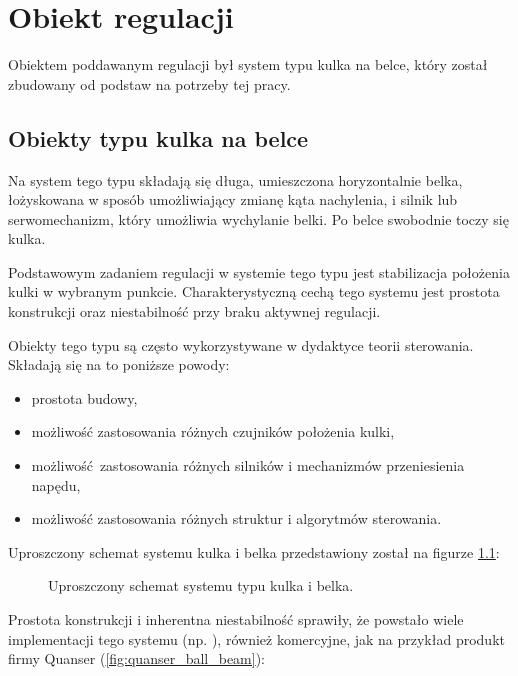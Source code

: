 \chapter{Obiekt regulacji}
\label{cha:ch2_obiekt_regulacji}

Obiektem poddawanym regulacji był system typu kulka na belce, który został zbudowany od podstaw na potrzeby tej pracy.

\section{Obiekty typu kulka na belce}

Na system tego typu składają się długa, umieszczona horyzontalnie belka, łożyskowana w sposób umożliwiający zmianę kąta nachylenia, i silnik lub serwomechanizm, który umożliwia wychylanie belki.
Po belce swobodnie toczy się kulka.

Podstawowym zadaniem regulacji w systemie tego typu jest stabilizacja położenia kulki w wybranym punkcie.
Charakterystyczną cechą tego systemu jest prostota konstrukcji oraz niestabilność przy braku aktywnej regulacji.

Obiekty tego typu są często wykorzystywane w dydaktyce teorii sterowania. Składają się na to poniższe powody:

\begin{itemize}
	\item prostota budowy,
	\item możliwość zastosowania różnych czujników położenia kulki,
	\item możliwość zastosowania różnych silników i mechanizmów przeniesienia napędu,
    \item możliwość zastosowania różnych struktur i algorytmów sterowania.
\end{itemize}

Uproszczony schemat systemu kulka i belka przedstawiony został na figurze \ref{fig:kulka_belka_schemat_uproszczony}:

\begin{figure}[H]
	\centering
    
	\caption{Uproszczony schemat systemu typu kulka i belka.}
	\label{fig:kulka_belka_schemat_uproszczony}
\end{figure}

Prostota konstrukcji i inherentna niestabilność sprawiły, że powstało wiele implementacji tego systemu (np. \cite{BABEX1}\cite{BABEX2}\cite{BABEX3}), również komercyjne, jak na przykład produkt firmy Quanser (\cref{fig:quanser_ball_beam}):

